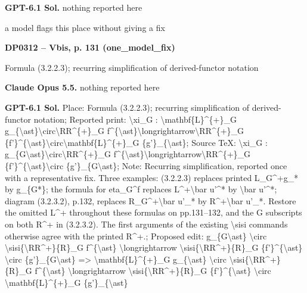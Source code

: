 \textbf{GPT-6.1 Sol.} nothing reported here\par
a model flags this place without giving a fix\par
\par\noindent\hypertarget{DP0312}{}\textbf{DP0312 -- Vbis, p. 131 (one\_model\_fix)}\par
Formula (3.2.2.3); recurring simplification of derived-functor notation\par
\textbf{Claude Opus 5.5.} nothing reported here\par
\textbf{GPT-6.1 Sol.} Place: Formula (3.2.2.3); recurring simplification of derived-functor notation; Reported print: \textbackslash{}xi\_G : \textbackslash{}mathbf\{L\}\textasciicircum{}\{+\}\_G g\_\{\textbackslash{}ast\}\textbackslash{}circ\textbackslash{}RR\textasciicircum{}\{+\}\_G f\textasciicircum{}\{\textbackslash{}ast\}\textbackslash{}longrightarrow\textbackslash{}RR\textasciicircum{}\{+\}\_G \{f'\}\textasciicircum{}\{\textbackslash{}ast\}\textbackslash{}circ\textbackslash{}mathbf\{L\}\textasciicircum{}\{+\}\_G \{g'\}\_\{\textbackslash{}ast\}; Source TeX: \textbackslash{}xi\_G : g\_\{G\textbackslash{}ast\}\textbackslash{}circ\textbackslash{}RR\textasciicircum{}\{+\}\_G f\textasciicircum{}\{\textbackslash{}ast\}\textbackslash{}longrightarrow\textbackslash{}RR\textasciicircum{}\{+\}\_G \{f'\}\textasciicircum{}\{\textbackslash{}ast\}\textbackslash{}circ \{g'\}\_\{G\textbackslash{}ast\}; Note: Recurring simplification, reported once with a representative fix. Three examples: (3.2.2.3) replaces printed L\_G\textasciicircum{}+g\_* by g\_\{G*\}; the formula for eta\_G\textasciicircum{}f replaces L\textasciicircum{}+\textbackslash{}bar u'\textasciicircum{}* by \textbackslash{}bar u'\textasciicircum{}*; diagram (3.2.3.2), p.132, replaces R\_G\textasciicircum{}+\textbackslash{}bar u'\_* by R\textasciicircum{}+\textbackslash{}bar u'\_*. Restore the omitted L\textasciicircum{}+ throughout these formulas on pp.131–132, and the G subscripts on both R\textasciicircum{}+ in (3.2.3.2). The first arguments of the existing \textbackslash{}sisi commands otherwise agree with the printed R\textasciicircum{}+.; Proposed edit: g\_\{G\textbackslash{}ast\} \textbackslash{}circ  \textbackslash{}sisi\{\textbackslash{}RR\textasciicircum{}+\}\{R\}\_G f\textasciicircum{}\{\textbackslash{}ast\} \textbackslash{}longrightarrow  \textbackslash{}sisi\{\textbackslash{}RR\textasciicircum{}+\}\{R\}\_G \{f'\}\textasciicircum{}\{\textbackslash{}ast\} \textbackslash{}circ          \{g'\}\_\{G\textbackslash{}ast\} =\allowbreak > \textbackslash{}mathbf\{L\}\textasciicircum{}\{+\}\_G g\_\{\textbackslash{}ast\} \textbackslash{}circ  \textbackslash{}sisi\{\textbackslash{}RR\textasciicircum{}+\}\{R\}\_G f\textasciicircum{}\{\textbackslash{}ast\} \textbackslash{}longrightarrow  \textbackslash{}sisi\{\textbackslash{}RR\textasciicircum{}+\}\{R\}\_G \{f'\}\textasciicircum{}\{\textbackslash{}ast\} \textbackslash{}circ          \textbackslash{}mathbf\{L\}\textasciicircum{}\{+\}\_G \{g'\}\_\{\textbackslash{}ast\}\par
